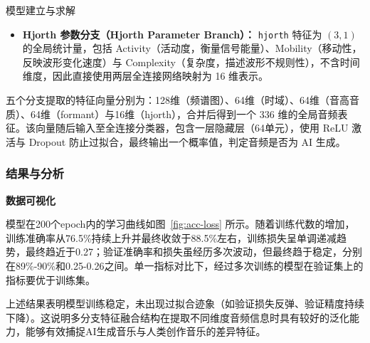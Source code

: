 \documentclass[aspectratio=169]{beamer}
\begin{document}
\begin{frame}{模型建立与求解}
\begin{itemize}
    \item \textbf{Hjorth 参数分支（Hjorth Parameter Branch）：} \texttt{hjorth} 特征为 $(3,1)$ 的全局统计量，包括 Activity（活动度，衡量信号能量）、Mobility（移动性，反映波形变化速度）与 Complexity（复杂度，描述波形不规则性），不含时间维度，因此直接使用两层全连接网络映射为 16 维表示。

\end{itemize}

五个分支提取的特征向量分别为：128维（频谱图）、64维（时域）、64维（音高音质）、64维（formant）与16维（hjorth），合并后得到一个 $336$ 维的全局音频表征。该向量随后输入至全连接分类器，包含一层隐藏层（64单元），使用 ReLU 激活与 Dropout 防止过拟合，最终输出一个概率值，判定音频是否为 AI 生成。



\subsubsection{结果与分析}
\noindent\textbf{数据可视化}\par
模型在200个epoch内的学习曲线如图~\ref{fig:acc-loss} 所示。随着训练代数的增加，训练准确率从76.5\%持续上升并最终收敛于88.5\%左右，训练损失呈单调递减趋势，最终趋近于0.27；验证准确率和损失虽经历多次波动，但最终趋于稳定，分别在89\%-90\%和0.25-0.26之间。单一指标对比下，经过多次训练的模型在验证集上的指标要优于训练集。

上述结果表明模型训练稳定，未出现过拟合迹象（如验证损失反弹、验证精度持续下降）。这说明多分支特征融合结构在提取不同维度音频信息时具有较好的泛化能力，能够有效捕捉AI生成音乐与人类创作音乐的差异特征。













\end{frame}
\end{document}
